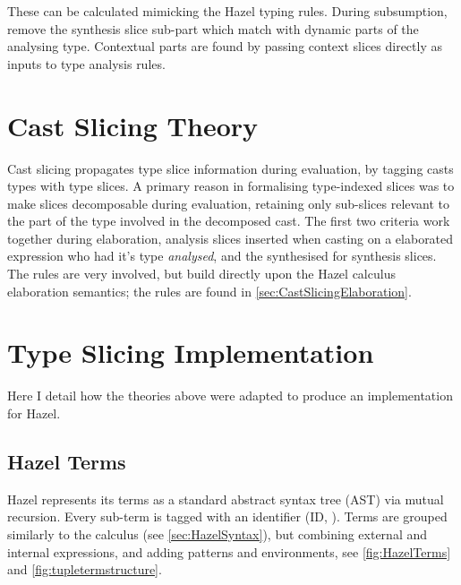 These can be calculated mimicking the Hazel typing rules. During subsumption, remove the synthesis slice sub-part which match with dynamic parts of the analysing type. Contextual parts are found by passing context slices directly as inputs to type analysis rules.

\section{Cast Slicing Theory}\label{sec:CastSlicingTheory}
Cast slicing propagates type slice information during evaluation, by tagging casts types with type slices. A primary reason in formalising type-indexed slices was to make slices decomposable during evaluation, retaining only sub-slices relevant to the part of the type involved in the decomposed cast. The first two criteria work together during elaboration, analysis slices inserted when casting on a elaborated expression who had it's type \textit{analysed}, and the synthesised for synthesis slices. The rules are very involved, but build directly upon the Hazel calculus elaboration semantics; the rules are found in
\cref{sec:CastSlicingElaboration}.

\section{Type Slicing Implementation}\label{sec:TypeSlicingImplementation}
Here I detail how the theories above were adapted to produce an implementation for Hazel.
\subsection{Hazel Terms}
\label{sec:HazelTerms}
Hazel represents its terms as a standard abstract syntax tree (AST) via mutual recursion. Every sub-term is tagged with an identifier (ID, ). Terms are grouped similarly to the calculus (see \cref{sec:HazelSyntax}), but combining external and internal expressions, and adding patterns and environments, see \cref{fig:HazelTerms} and \ref{fig:tupletermstructure}.


